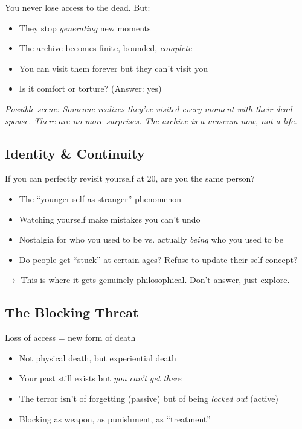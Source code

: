\documentclass[11pt,letterpaper]{article}
\begin{document}
You never lose access to the dead. But:

\begin{itemize}[leftmargin=*]
    \item They stop \textit{generating} new moments
    \item The archive becomes finite, bounded, \textit{complete}
    \item You can visit them forever but they can't visit you
    \item Is it comfort or torture? (Answer: yes)
\end{itemize}

\textit{Possible scene: Someone realizes they've visited every moment with their dead spouse. There are no more surprises. The archive is a museum now, not a life.}

\subsection*{Identity \& Continuity}

If you can perfectly revisit yourself at 20, are you the same person?

\begin{itemize}[leftmargin=*]
    \item The ``younger self as stranger'' phenomenon
    \item Watching yourself make mistakes you can't undo
    \item Nostalgia for who you used to be vs. actually \textit{being} who you used to be
    \item Do people get ``stuck'' at certain ages? Refuse to update their self-concept?
\end{itemize}

\textcolor{ideagreen}{$\rightarrow$ This is where it gets genuinely philosophical. Don't answer, just explore.}

\subsection*{The Blocking Threat}

Loss of access = new form of death

\begin{itemize}[leftmargin=*]
    \item Not physical death, but experiential death
    \item Your past still exists but \textit{you can't get there}
    \item The terror isn't of forgetting (passive) but of being \textit{locked out} (active)
    \item Blocking as weapon, as punishment, as ``treatment''
\end{itemize}
\end{document}
